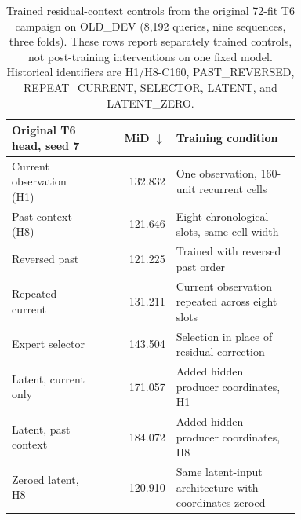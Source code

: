 \begin{table}[htbp]
\centering\small
\begin{tabular}{p{0.30\linewidth}rp{0.43\linewidth}}
\toprule
Original T6 head, seed 7 & MiD $\downarrow$ & Training condition \\
\midrule
Current observation (H1) & 132.832 & One observation, 160-unit recurrent cells \\
Past context (H8) & 121.646 & Eight chronological slots, same cell width \\
Reversed past & 121.225 & Trained with reversed past order \\
Repeated current & 131.211 & Current observation repeated across eight slots \\
Expert selector & 143.504 & Selection in place of residual correction \\
Latent, current only & 171.057 & Added hidden producer coordinates, H1 \\
Latent, past context & 184.072 & Added hidden producer coordinates, H8 \\
Zeroed latent, H8 & 120.910 & Same latent-input architecture with coordinates zeroed \\
\bottomrule
\end{tabular}
\caption{Trained residual-context controls from the original 72-fit T6 campaign on OLD\_DEV (8,192 queries, nine sequences, three folds). These rows report separately trained controls, not post-training interventions on one fixed model. Historical identifiers are H1/H8-C160, PAST\_REVERSED, REPEAT\_CURRENT, SELECTOR, LATENT, and LATENT\_ZERO. }
\label{tab:original-t6}
\end{table}

